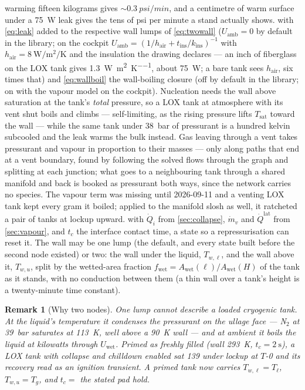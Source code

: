 \documentclass[11pt,a4paper]{article}
\newtheorem{remark}{Remark}
\newcommand{\mdot}{\dot{m}}
\newcommand{\Qdot}{\dot{Q}}
\begin{document}
warming fifteen kilograms gives $\sim\SI{0.3}{psi/min}$, and a centimetre of
warm surface under a \SI{75}{\watt} leak gives the tens of psi per minute a stand
actually shows.
with \cref{eq:leak} added to the respective wall lumps of \cref{eq:twowall}
($U_{\mathrm{amb}}=0$ by default in the library; on the cockpit
$U_{\mathrm{amb}} = (1/h_{\mathrm{air}} + t_{\mathrm{ins}}/k_{\mathrm{ins}})^{-1}$ with
$h_{\mathrm{air}}=\SI{8}{\watt\per\square\metre\per\kelvin}$ and the insulation the
drawing declares --- an inch of fiberglass on the LOX tank gives
\SI{1.3}{\watt\per\square\metre\per\kelvin}, about \SI{75}{\watt}; a bare tank sees
$h_{\mathrm{air}}$, six times that) and \cref{eq:wallboil}
the wall-boiling closure (off by default in the library; on with the vapour
model on the cockpit). Nucleation needs the wall above saturation at the
tank's \emph{total} pressure, so a LOX tank at atmosphere with its vent shut
boils and climbs --- self-limiting, as the rising pressure lifts
$T_{\mathrm{sat}}$ toward the wall --- while the same tank under
\SI{38}{\bar} of pressurant is a hundred kelvin subcooled and the leak warms
the bulk instead. Gas leaving through a vent takes pressurant and vapour in
proportion to their masses --- only along paths that end at a vent boundary,
found by following the solved flows through the graph and splitting at each
junction; what goes to a neighbouring tank through a shared manifold and back
is booked as pressurant both ways, since the network carries no species. The
vapour term was missing until 2026-09-11 and a venting LOX tank kept every
gram it boiled; applied to the manifold slosh as well, it ratcheted a pair of
tanks at lockup upward.
with $\Qdot_i$ from \cref{sec:collapse}, $\mdot_v$ and $\Qdot^{\mathrm{lat}}$
from \cref{sec:vapour}, and $t_c$ the interface contact time, a state so a
repressurisation can reset it. The wall may be one lump (the default, and
every state built before the second node existed) or two: the wall under the
liquid, $T_{w,\ell}$, and the wall above it, $T_{w,u}$, split by the wetted-area
fraction $f_{\mathrm{wet}} = A_{\mathrm{wet}}(\ell)/A_{\mathrm{wet}}(H)$ of the
tank as it stands, with no conduction between them (a thin wall over a tank's
height is a twenty-minute time constant).
\begin{remark}[Why two nodes]
One lump cannot describe a loaded cryogenic tank. At the liquid's temperature
it condenses the pressurant on the ullage face --- N$_2$ at \SI{39}{\bar}
saturates at \SI{113}{\kelvin}, well above a \SI{90}{\kelvin} wall --- and at
ambient it boils the liquid at kilowatts through $U_{\mathrm{wet}}$. Primed as
freshly filled (wall \SI{293}{\kelvin}, $t_c=\SI{2}{\second}$), a LOX tank with
collapse and chilldown enabled sat \SI{139}{\psi} under lockup at $T$-0 and its
recovery read as an ignition transient. A primed tank now carries
$T_{w,\ell}=T_\ell$, $T_{w,u}=T_g$, and $t_c=$ the stated pad hold.
\end{remark}
\end{document}
